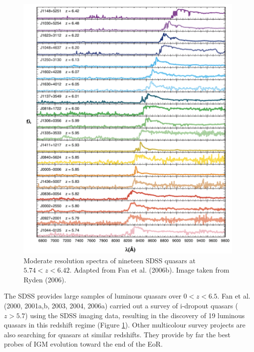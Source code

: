 \documentclass[a4paper,11pt]{article}
\begin{document}
\begin{figure}[t]
    \includegraphics[width=14cm]{figures/SDSSQSO.png}
    \centering
    \caption{\footnotesize{Moderate resolution spectra of nineteen SDSS quasars at $5.74<z<6.42$. Adapted from Fan et al. (2006b). Image taken from Ryden (2006).}}
    \label{fig:sdssqso}
\end{figure}

{\noindent}The SDSS provides large samples of luminous quasars over $0<z<6.5$. Fan et al. (2000, 2001a,b, 2003, 2004, 2006a) carried out a survey of i-dropout quasars ($z>5.7$) using the SDSS imaging data, resulting in the discovery of 19 luminous quasars in this redshift regime (Figure \ref{fig:sdssqso}). Other multicolour survey projects are also searching for quasars at similar redshifts. They provide by far the best probes of IGM evolution toward the end of the EoR.
\end{document}
